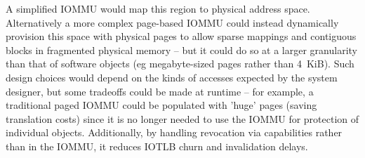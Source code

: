 A simplified IOMMU would map this region to physical address space.
Alternatively a more complex page-based IOMMU could instead
dynamically provision this space with physical pages to allow sparse mappings
and contiguous blocks in fragmented physical memory -- but it could do so at a
larger granularity than that of software objects (eg megabyte-sized pages
rather than 4~KiB).  Such design choices would depend on the kinds of accesses
expected by the system designer, but some tradeoffs could be made at runtime --
for example, a traditional paged IOMMU could be populated with 'huge' pages
(saving translation costs) since it is no longer needed to use
the IOMMU for protection of individual objects.  Additionally, by handling
revocation via capabilities rather than in the IOMMU, it reduces IOTLB churn
and invalidation delays.
